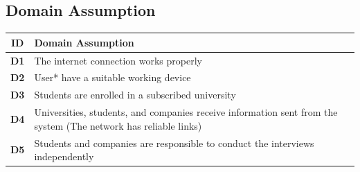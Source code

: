 \subsection{Domain Assumption}\label{subsec:domain-assumption}
\renewcommand{\arraystretch}{1.5}
\begin{center}
    \begin{longtable}{|c|p{}|}
        \hline
        \rowcolor[HTML]{FFF9C4}
        \textbf{ID} & \textbf{Domain Assumption} \\ \hline
        \rowcolor[HTML]{FFFFFF}
        \textbf{D1} & The internet connection works properly \\ \hline
        \rowcolor[HTML]{F0F0F0}
        \textbf{D2} & User* have a suitable working device \\ \hline
        \rowcolor[HTML]{FFFFFF}
        \textbf{D3} & Students are enrolled in a subscribed university \\ \hline
        \rowcolor[HTML]{F0F0F0}
        \textbf{D4} & Universities, students, and companies receive information sent from the system (The network has reliable links) \\ \hline
        \rowcolor[HTML]{FFFFFF}
        \textbf{D5} & Students and companies are responsible to conduct the interviews independently \\ \hline
    \end{longtable}
\end{center}

